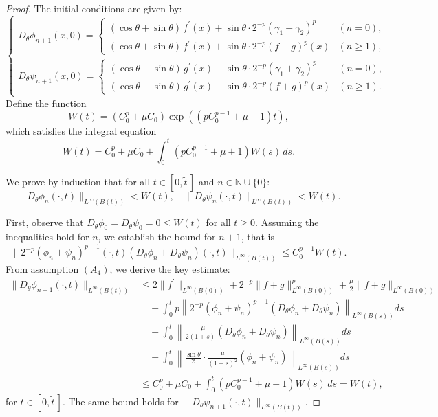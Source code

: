 \documentclass[
  sn-mathphys-num,
  colorlinks,
  linkcolor=darkmagenta,
  citecolor=rufous,
  urlcolor=zaffre,
  hypertexnames=false
]{sn-jnl}
\numberwithin{equation}{section}
\begin{document}
\begin{proof}
The initial conditions are given by:
$$
\begin{cases}
D_\theta \phi_{n+1}(x,0) = 
\begin{cases}
(\cos\theta+\sin\theta)\,f^\prime(x) + \sin\theta\cdot 2^{-p}(\gamma_1+\gamma_2)^p & (n = 0), \\
(\cos\theta+\sin\theta)\,f^\prime(x) + \sin\theta\cdot 2^{-p}(f+g)^p(x) & (n \geq 1),
\end{cases} \\[6pt]
D_\theta \psi_{n+1}(x,0) = 
\begin{cases}
(\cos\theta-\sin\theta)\,g^\prime(x) + \sin\theta\cdot 2^{-p}(\gamma_1+\gamma_2)^p & (n = 0), \\
(\cos\theta-\sin\theta)\,g^\prime(x) + \sin\theta\cdot 2^{-p}(f+g)^p(x) & (n \geq 1).
\end{cases}
\end{cases}
$$
\noindent Define the function
$$
W(t) = (C_0^p + \mu C_0) \exp\left((pC_0^{p-1} + \mu + 1) t\right),
$$
which satisfies the integral equation
\begin{equation}
W(t) = C_0^p + \mu C_0 + \int_0^t (pC_0^{p-1} + \mu + 1) W(s) \, ds.
\label{eq:2.4a}
\end{equation}

We prove by induction that for all $t \in [0, \tilde{t}\,]$ and $n \in \mathbb{N} \cup \{0\}$:
\begin{equation}
\|D_\theta \phi_n(\cdot, t)\|_{L^\infty(B(t))} < W(t), \quad 
\|D_\theta \psi_n(\cdot, t)\|_{L^\infty(B(t))} < W(t).
\label{eq:2.5}
\end{equation}

First, observe that $D_\theta \phi_0 = D_\theta \psi_0 = 0 \leq W(t)$ for all $t \geq 0$. Assuming the inequalities hold for $n$, we establish the bound for $n+1$, that is
\begin{equation}
\|2^{-p} (\phi_n + \psi_n)^{p-1} (\cdot, t) (D_\theta \phi_n + D_\theta \psi_n) (\cdot, t)\|_{L^\infty(B(t))} \leq C_0^{p-1} W(t).
\label{eq:2.6}
\end{equation}
From assumption $(A_4)$, we derive the key estimate:
\begin{equation}
\begin{aligned}
\|D_\theta \phi_{n+1}(\cdot, t)\|_{L^\infty(B(t))} 
&\leq 2 \|f^\prime\|_{L^\infty(B(0))} + 2^{-p} \|f + g\|_{L^\infty(B(0))}^p + \frac{\mu}{2} \|f + g\|_{L^\infty(B(0))} \\
&\quad + \int_0^t p \left\| 2^{-p} (\phi_n + \psi_n)^{p-1} (D_\theta \phi_n + D_\theta \psi_n) \right\|_{L^\infty(B(s))} ds \\
&\quad + \int_0^t \left\| \frac{-\mu}{2(1+s)} (D_\theta \phi_n + D_\theta \psi_n) \right\|_{L^\infty(B(s))} ds \\
&\quad + \int_0^t \left\| \frac{\sin \theta}{2} \cdot \frac{\mu}{(1+s)^2} (\phi_n + \psi_n) \right\|_{L^\infty(B(s))} ds \\
&\leq C_0^p + \mu C_0 + \int_0^t (p C_0^{p-1} + \mu + 1) W(s) \, ds = W(t),
\end{aligned}
\label{eq:2.7}
\end{equation}
for $t \in [0, \tilde{t}\,]$. The same bound holds for $\|D_\theta \psi_{n+1}(\cdot, t)\|_{L^\infty(B(t))}$.


\end{proof}
\end{document}
